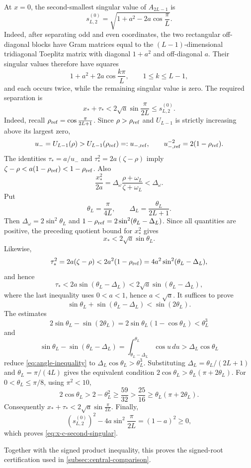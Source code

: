 \documentclass[10pt,twoside]{siamart1116}
\numberwithin{equation}{section}
\begin{document}
At \(x=0\), the second-smallest singular value of \(A_{2L-1}\) is
\[
 s_{L,2}^{(0)}=\sqrt{1+a^2-2a\cos\frac{\pi}{L}}.
\]
Indeed, after separating odd and even coordinates, the two rectangular
off-diagonal blocks have Gram matrices equal to the
\((L-1)\)-dimensional tridiagonal Toeplitz matrix with diagonal
\(1+a^2\) and off-diagonal \(a\).  Their singular values therefore have
squares
\[
 1+a^2+2a\cos\frac{k\pi}{L},\qquad 1\leq k\leq L-1,
\]
and each occurs twice, while the remaining singular value is zero.
The required separation is
\[
 x_*+\tau_*<2\sqrt a\sin\frac{\pi}{2L}\leq s_{L,2}^{(0)}.
\]
Indeed, recall \(\rho_{\rm ref}=\cos\frac{\pi}{2L+1}\).  Since
\(\rho>\rho_{\rm ref}\) and \(U_{L-1}\) is strictly increasing above its
largest zero,
\[
 u_-=U_{L-1}(\rho)>U_{L-1}(\rho_{\rm ref})=:u_{-,\rm ref},
 \qquad u_{-,\rm ref}^{-2}=2(1-\rho_{\rm ref}).
\]
The identities \(\tau_*=a/u_-\) and \(\tau_*^2=2a(\zeta-\rho)\) imply
\(\zeta-\rho<a(1-\rho_{\rm ref})<1-\rho_{\rm ref}\).  Also
\[
 \frac{x_*^2}{2a}
 =\Delta_\omega\frac{\rho+\omega_L}{\zeta+\omega_L}
 <\Delta_\omega.
\]
Put
\[
 \theta_L=\frac{\pi}{4L},\qquad
 \Delta_L=\frac{\theta_L}{2L+1}.
\]
Then \(\Delta_\omega=2\sin^2\theta_L\) and
\(1-\rho_{\rm ref}=2\sin^2(\theta_L-\Delta_L)\).  Since all quantities are
positive, the preceding quotient bound for \(x_*^2\) gives
\[
 x_*<2\sqrt a\sin\theta_L.
\]
Likewise,
\[
 \tau_*^2=2a(\zeta-\rho)
 <2a^2(1-\rho_{\rm ref})
 =4a^2\sin^2(\theta_L-\Delta_L),
\]
and hence
\[
 \tau_*<2a\sin(\theta_L-\Delta_L)
 <2\sqrt a\sin(\theta_L-\Delta_L),
\]
where the last inequality uses \(0<a<1\), hence \(a<\sqrt a\).
It suffices to prove
\begin{equation}\label{eq:angle-inequality}
 \sin\theta_L+\sin(\theta_L-\Delta_L)<\sin(2\theta_L).
\end{equation}
The estimates
\[
 2\sin\theta_L-\sin(2\theta_L)
 =2\sin\theta_L(1-\cos\theta_L)<\theta_L^3
\]
and
\[
 \sin\theta_L-\sin(\theta_L-\Delta_L)
 =\int_{\theta_L-\Delta_L}^{\theta_L}\cos u\,du
 >\Delta_L\cos\theta_L
\]
reduce \eqref{eq:angle-inequality} to
\(\Delta_L\cos\theta_L>\theta_L^3\).  Substituting
\(\Delta_L=\theta_L/(2L+1)\) and \(\theta_L=\pi/(4L)\) gives the equivalent
condition \(2\cos\theta_L>\theta_L(\pi+2\theta_L)\).  For
\(0<\theta_L\leq\pi/8\), using \(\pi^2<10\),
\[
 2\cos\theta_L>2-\theta_L^2\geq\frac{59}{32}
 >\frac{25}{16}\geq\theta_L(\pi+2\theta_L).
\]
Consequently \(x_*+\tau_*<2\sqrt a\sin\frac{\pi}{2L}\).  Finally,
\[
 (s_{L,2}^{(0)})^2-4a\sin^2\frac{\pi}{2L}
 =(1-a)^2\geq0,
\]
which proves \eqref{eq:x-c-second-singular}.

Together with the signed product inequality, this proves the signed-root
certification used in \cref{subsec:central-comparison}.



\clearpage
{}


\end{document}
